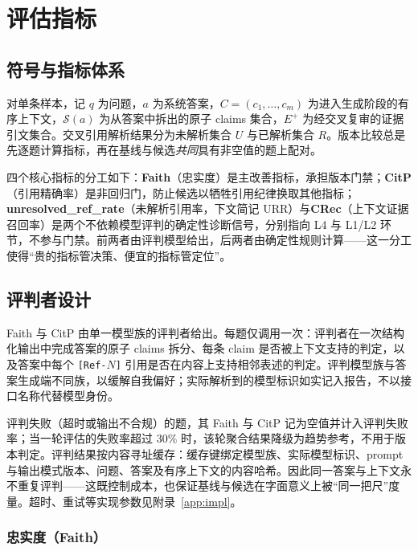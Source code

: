\documentclass[11pt,a4paper,fontset=fandol]{ctexart}
\begin{document}
\section{评估指标}
\label{sec:metrics}

\subsection{符号与指标体系}
\label{sec:notation}

对单条样本，记 $q$ 为问题，$a$ 为系统答案，$C=(c_1,\ldots,c_m)$ 为进入生成阶段的有序上下文，$\mathcal{S}(a)$ 为从答案中拆出的原子 claims 集合，$E^+$ 为经交叉复审的证据引文集合。交叉引用解析结果分为未解析集合 $U$ 与已解析集合 $R$。版本比较总是先逐题计算指标，再在基线与候选\emph{共同}具有非空值的题上配对。

四个核心指标的分工如下：\textbf{Faith}（忠实度）是主改善指标，承担版本门禁；\textbf{CitP}（引用精确率）是非回归门，防止候选以牺牲引用纪律换取其他指标；\textbf{unresolved\_ref\_rate}（未解析引用率，下文简记 URR）与\textbf{CRec}（上下文证据召回率）是两个不依赖模型评判的确定性诊断信号，分别指向 L4 与 L1/L2 环节，不参与门禁。前两者由评判模型给出，后两者由确定性规则计算——这一分工使得``贵的指标管决策、便宜的指标管定位''。

\subsection{评判者设计}
\label{sec:judge}

Faith 与 CitP 由单一模型族的评判者给出。每题仅调用一次：评判者在一次结构化输出中完成答案的原子 claims 拆分、每条 claim 是否被上下文支持的判定，以及答案中每个 \texttt{[Ref-$N$]} 引用是否在内容上支持相邻表述的判定\cite{geval}。评判模型族与答案生成端不同族，以缓解自我偏好\cite{wataoka2024selfpref}；实际解析到的模型标识如实记入报告，不以接口名称代替模型身份。

评判失败（超时或输出不合规）的题，其 Faith 与 CitP 记为空值并计入评判失败率；当一轮评估的失败率超过 $30\%$ 时，该轮聚合结果降级为趋势参考，不用于版本判定。评判结果按内容寻址缓存：缓存键绑定模型族、实际模型标识、prompt 与输出模式版本、问题、答案及有序上下文的内容哈希。因此同一答案与上下文永不重复评判——这既控制成本，也保证基线与候选在字面意义上被``同一把尺''度量。超时、重试等实现参数见附录~\ref{app:impl}。

\subsubsection{忠实度（Faith）}
\end{document}
